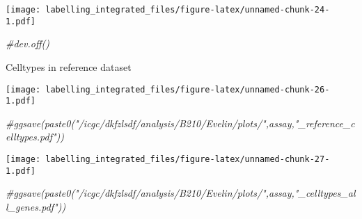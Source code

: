 \documentclass[]{article}
\newenvironment{Shaded}{\begin{snugshade}}{\end{snugshade}}
\newcommand{\CommentTok}[1]{\textcolor[rgb]{0.56,0.35,0.01}{\textit{#1}}}
\newcommand{\DataTypeTok}[1]{\textcolor[rgb]{0.13,0.29,0.53}{#1}}
\newcommand{\DecValTok}[1]{\textcolor[rgb]{0.00,0.00,0.81}{#1}}
\newcommand{\KeywordTok}[1]{\textcolor[rgb]{0.13,0.29,0.53}{\textbf{#1}}}
\newcommand{\NormalTok}[1]{#1}
\newcommand{\OperatorTok}[1]{\textcolor[rgb]{0.81,0.36,0.00}{\textbf{#1}}}
\newcommand{\StringTok}[1]{\textcolor[rgb]{0.31,0.60,0.02}{#1}}
\begin{document}
\texttt{[image: labelling\_integrated\_files/figure-latex/unnamed-chunk-24-1.pdf]}

\begin{Shaded}
\begin{Highlighting}[]
\CommentTok{#dev.off()}
\end{Highlighting}
\end{Shaded}

Celltypes in reference dataset

\begin{Shaded}
\end{Shaded}

\texttt{[image: labelling\_integrated\_files/figure-latex/unnamed-chunk-26-1.pdf]}

\begin{Shaded}
\begin{Highlighting}[]
\CommentTok{#ggsave(paste0("/icgc/dkfzlsdf/analysis/B210/Evelin/plots/",assay,"_reference_celltypes.pdf"))}
\end{Highlighting}
\end{Shaded}

\begin{Shaded}
\end{Shaded}

\texttt{[image: labelling\_integrated\_files/figure-latex/unnamed-chunk-27-1.pdf]}

\begin{Shaded}
\begin{Highlighting}[]
\CommentTok{#ggsave(paste0("/icgc/dkfzlsdf/analysis/B210/Evelin/plots/",assay,"_celltypes_all_genes.pdf"))}
\end{Highlighting}
\end{Shaded}
\end{document}
